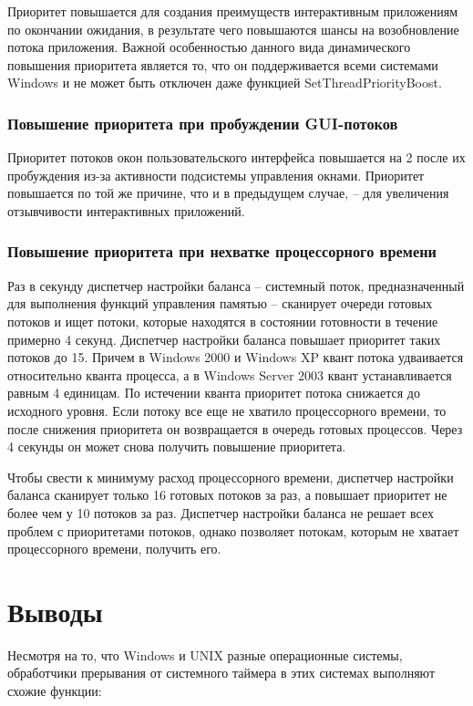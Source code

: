 Приоритет повышается для создания преимуществ интерактивным приложениям по окончании ожидания, в результате чего повышаются шансы на возобновление потока приложения. Важной особенностью данного вида динамического повышения приоритета является то, что он поддерживается всеми системами Windows и не может быть отключен даже функцией SetThreadPriorityBoost.

\subsection{Повышение приоритета при пробуждении GUI-потоков}

Приоритет потоков окон пользовательского интерфейса повышается на 2 после их пробуждения из-за активности подсистемы управления окнами. Приоритет повышается по той же причине, что и в предыдущем случае, -- для увеличения отзывчивости интерактивных приложений.

\subsection{Повышение приоритета при нехватке процессорного времени}

Раз в секунду диспетчер настройки баланса -- системный поток, предназначенный для выполнения функций управления памятью -- сканирует очереди готовых потоков и ищет потоки, которые находятся в состоянии готовности в течение примерно 4 секунд. Диспетчер настройки баланса повышает приоритет таких потоков до 15. Причем в Windows 2000 и Windows XP квант потока удваивается относительно кванта процесса, а в Windows Server 2003 квант устанавливается равным 4 единицам. По истечении кванта приоритет потока снижается до исходного уровня. Если потоку все еще не хватило процессорного времени, то после снижения приоритета он возвращается в очередь готовых процессов. Через 4 секунды он может снова получить повышение приоритета.

Чтобы свести к минимуму расход процессорного времени, диспетчер настройки баланса сканирует только 16 готовых потоков за раз, а повышает приоритет не более чем у 10 потоков за раз. Диспетчер настройки баланса не решает всех проблем с приоритетами потоков, однако позволяет потокам, которым не хватает процессорного времени, получить его.

\chapter*{Выводы}

Несмотря на то, что Windows и UNIX разные операционные системы, обработчики прерывания от системного таймера в этих системах выполняют схожие функции:

